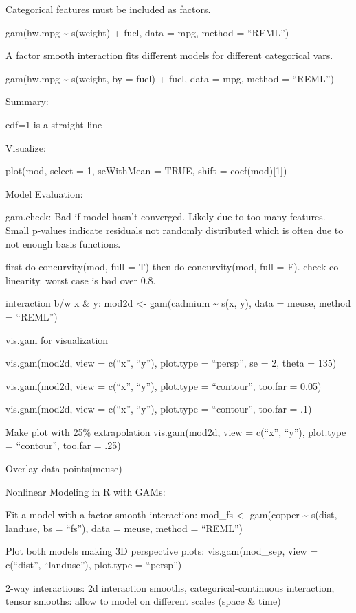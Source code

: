 \documentclass[]{book}
\begin{document}
Categorical features must be included as factors.

gam(hw.mpg \textasciitilde{} s(weight) + fuel, data = mpg, method = ``REML'')

A factor smooth interaction fits different models for different categorical vars.

gam(hw.mpg \textasciitilde{} s(weight, by = fuel) + fuel, data = mpg, method = ``REML'')

Summary:

edf=1 is a straight line

Visualize:

plot(mod, select = 1, seWithMean = TRUE, shift = coef(mod){[}1{]})

Model Evaluation:

gam.check: Bad if model hasn't converged. Likely due to too many features. Small p-values indicate residuals not randomly distributed which is often due to not enough basis functions.

first do concurvity(mod, full = T) then do concurvity(mod, full = F). check co-linearity. worst case is bad over 0.8.

interaction b/w x \& y: mod2d \textless{}- gam(cadmium \textasciitilde{} s(x, y), data = meuse, method = ``REML'')

vis.gam for visualization

vis.gam(mod2d, view = c(``x'', ``y''),
plot.type = ``persp'', se = 2, theta = 135)

vis.gam(mod2d, view = c(``x'', ``y''),
plot.type = ``contour'', too.far = 0.05)

vis.gam(mod2d, view = c(``x'', ``y''), plot.type = ``contour'', too.far = .1)

Make plot with 25\% extrapolation
vis.gam(mod2d, view = c(``x'', ``y''),
plot.type = ``contour'', too.far = .25)

Overlay data
points(meuse)

Nonlinear Modeling in R with GAMs:

Fit a model with a factor-smooth interaction:
mod\_fs \textless{}- gam(copper \textasciitilde{} s(dist, landuse, bs = ``fs''), data = meuse, method = ``REML'')

Plot both models making 3D perspective plots:
vis.gam(mod\_sep, view = c(``dist'', ``landuse''), plot.type = ``persp'')

2-way interactions: 2d interaction smooths, categorical-continuous interaction, tensor smooths: allow to model on different scales (space \& time)
\end{document}
